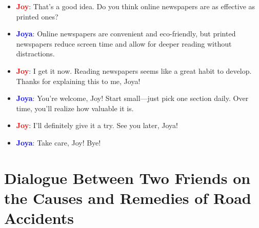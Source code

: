 \documentclass{article}
\begin{document}
\begin{itemize}
    \item \textbf{\textcolor{red}{Joy}}: That’s a good idea. Do you think online newspapers are as effective as printed ones?
    \item \textbf{\textcolor{blue}{Joya}}: Online newspapers are convenient and eco-friendly, but printed newspapers reduce screen time and allow for deeper reading without distractions.
    \item \textbf{\textcolor{red}{Joy}}: I get it now. Reading newspapers seems like a great habit to develop. Thanks for explaining this to me, Joya!
    \item \textbf{\textcolor{blue}{Joya}}: You’re welcome, Joy! Start small—just pick one section daily. Over time, you’ll realize how valuable it is.
    \item \textbf{\textcolor{red}{Joy}}: I’ll definitely give it a try. See you later, Joya!
    \item \textbf{\textcolor{blue}{Joya}}: Take care, Joy! Bye!
\end{itemize}

\section*{Dialogue Between Two Friends on the Causes and Remedies of Road Accidents}
\end{document}
